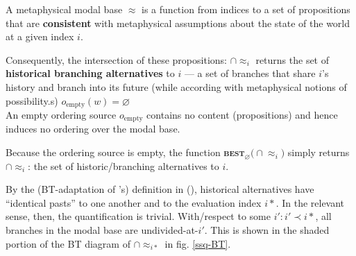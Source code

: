 A metaphysical modal base $ \approx$ is a function from indices to a set of propositions that are \textbf{consistent} with metaphysical assumptions about the state of the world at a given index $ i $.

Consequently, the intersection of these propositions: $ \cap\!\approx_i$ returns the set of \textbf{historical branching alternatives} to $ i $ --- a set of branches that share $ i $'s history and branch into its future (while according with metaphysical notions of possibility.s)
\a %
$ o_{\text{empty}}(w)=\varnothing$\\
An empty ordering source $ o_\text{empty}$ contains no content (propositions) and hence induces no ordering over the modal base.





\a Because the ordering source is empty, the function \textbf{\textsc{best}}$_{\varnothing}\big(\cap\!\approx_i\big)$ simply returns $ \cap\!\approx_i $: the set of historic/branching alternatives to $ i $.
\xe

By the (BT-adaptation of \citeauthor{Thomason1970}'s) definition in (), historical alternatives have ``identical pasts'' to one another and to the evaluation index $ i* $. In the relevant sense, then, the quantification is trivial. With/respect to some $ i':i'\prec i* $, all branches in the modal base are undivided-at-$ i' $. This is shown in the shaded portion of the BT diagram of $ \cap\!\approx_{i*} $ in fig. \ref{ssq-BT}.


